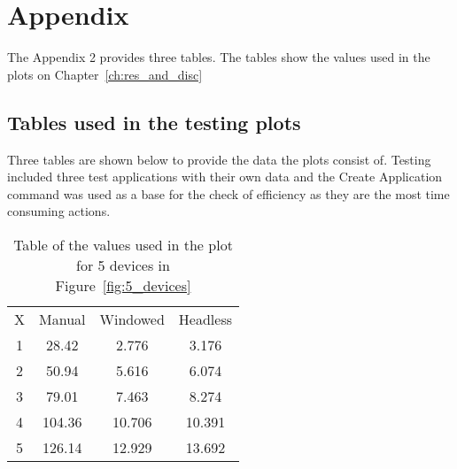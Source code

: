 
\chapter{Appendix}\label{appx:tables}

The Appendix 2 provides three tables.
The tables show the values used in the plots on Chapter~\ref{ch:res_and_disc}

\section{Tables used in the testing plots}
Three tables are shown below to provide the data the plots consist of.
Testing included three test applications with their own data and the Create Application command was used as a base for the check of efficiency as they are the most time consuming actions.
\clearpage

\begin{table}[]
    \centering
    \begin{tabular}{c c c c}
    X & Manual & Windowed & Headless  \\
    1 & 28.42 & 2.776 & 3.176  \\
    2 & 50.94 & 5.616 & 6.074  \\
    3 & 79.01 & 7.463 & 8.274 \\
    4 & 104.36 & 10.706 & 10.391  \\
    5 & 126.14 & 12.929 & 13.692  \\
\end{tabular}
    \caption{Table of the values used in the plot for 5 devices in Figure~\ref{fig:5_devices}}
    \label{tab:5_devices}
\end{table}



